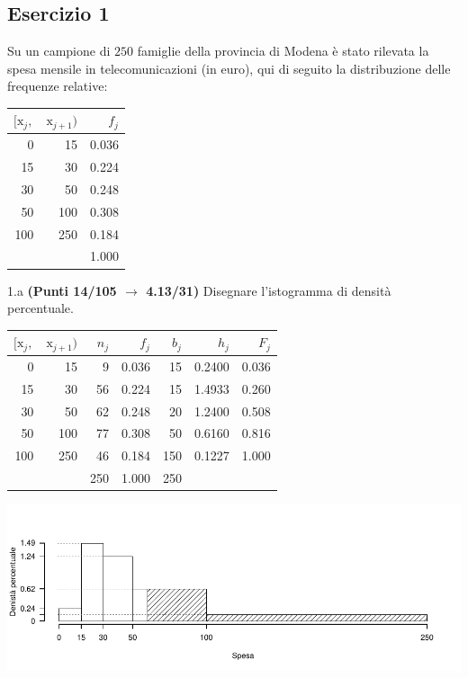 \documentclass[
  11pt,
]{book}
\theoremstyle{mytheoremstyle}
\theoremstyle{mydefstyle}
\newenvironment{sol}
  {
  \begin{tcolorbox}[enhanced,breakable,arc=0.1mm,boxrule=1pt,colback=white,colframe=iblue,
  title=\bf \fontfamily{lmss}\selectfont \hspace{.5 cm} Soluzione,drop fuzzy shadow]

}{
\end{tcolorbox}
  }
\begin{document}
\subsection{Esercizio 1}\label{esercizio-1-28}

Su un campione di \(250\) famiglie della provincia di Modena è stato rilevata la spesa mensile in telecomunicazioni (in euro), qui di seguito
la distribuzione delle frequenze relative:

\begin{table}[H]
\centering
\begin{tabular}{rrr}
\toprule
$[\text{x}_j,$ & $\text{x}_{j+1})$ & $f_j$\\
\midrule
0 & 15 & 0.036\\
15 & 30 & 0.224\\
30 & 50 & 0.248\\
50 & 100 & 0.308\\
100 & 250 & 0.184\\
 &  & 1.000\\
\bottomrule
\end{tabular}
\end{table}

1.a \textbf{(Punti 14/105 \(\rightarrow\) 4.13/31)} Disegnare l'istogramma di densità percentuale.

\begin{sol}

\begin{table}[H]
\centering
\begin{tabular}{rrrrrrr}
\toprule
$[\text{x}_j,$ & $\text{x}_{j+1})$ & $n_j$ & $f_j$ & $b_j$ & $h_j$ & $F_j$\\
\midrule
0 & 15 & 9 & 0.036 & 15 & 0.2400 & 0.036\\
15 & 30 & 56 & 0.224 & 15 & 1.4933 & 0.260\\
30 & 50 & 62 & 0.248 & 20 & 1.2400 & 0.508\\
50 & 100 & 77 & 0.308 & 50 & 0.6160 & 0.816\\
100 & 250 & 46 & 0.184 & 150 & 0.1227 & 1.000\\
 &  & 250 & 1.000 & 250 &  & \\
\bottomrule
\end{tabular}
\end{table}

\begin{center}\includegraphics{Esami_passati_con_soluzioni_files/figure-latex/2023-186-1} \end{center}

\end{sol}
\end{document}
